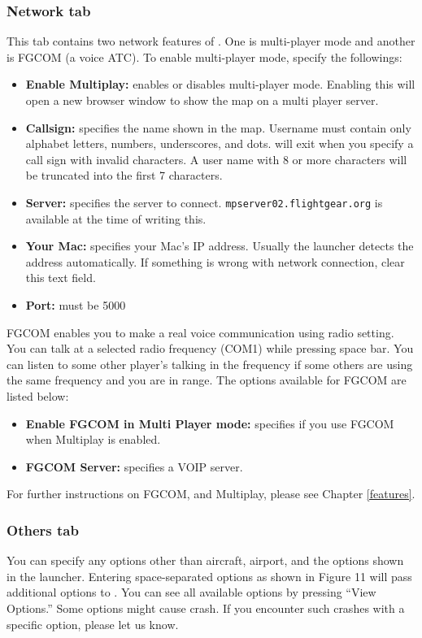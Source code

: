 \subsubsection{Network tab}
This tab contains two network features of \FlightGear{}. One is multi-player mode and another is FGCOM (a voice ATC). To enable multi-player mode, specify the followings:
\begin{itemize}
\item \textbf{Enable Multiplay:} enables or disables multi-player mode. Enabling this will open a new browser window to show the map on a multi player server.
\item \textbf{Callsign:} specifies the name shown in the map. Username must contain only alphabet letters, numbers, underscores, and dots. \FlightGear{} will exit when you specify a call sign with invalid characters. A user name with 8 or more characters will be truncated into the first 7 characters. 
\item \textbf{Server:} specifies the server to connect. \texttt{mpserver02.flightgear.org} is available at the time of writing this.
\item \textbf{Your Mac:} specifies your Mac's IP address. Usually the launcher detects the address automatically. If something is wrong with network connection, clear this text field.
\item \textbf{Port:} must be 5000
\end{itemize}

FGCOM enables you to make a real voice communication using radio setting. You can talk at a selected radio frequency (COM1) while pressing space bar. You can listen to some other player's talking in the frequency if some others are using the same frequency and you are in range. The options available for FGCOM are listed below:

\begin{itemize}
\item \textbf{Enable FGCOM in Multi Player mode:} specifies if you use FGCOM when Multiplay is enabled.
\item \textbf{FGCOM Server:} specifies a VOIP server.
\end{itemize}

For further instructions on FGCOM, and Multiplay, please see Chapter \ref{features}.

\subsubsection{Others tab}
You can specify any options other than aircraft, airport, and the options shown in the launcher. Entering space-separated options as shown in Figure 11 will pass additional options to \FlightGear{}. You can see all available options by pressing ``View Options.'' Some options might cause \FlightGear{} crash. If you encounter such crashes with a specific option, please let us know.

